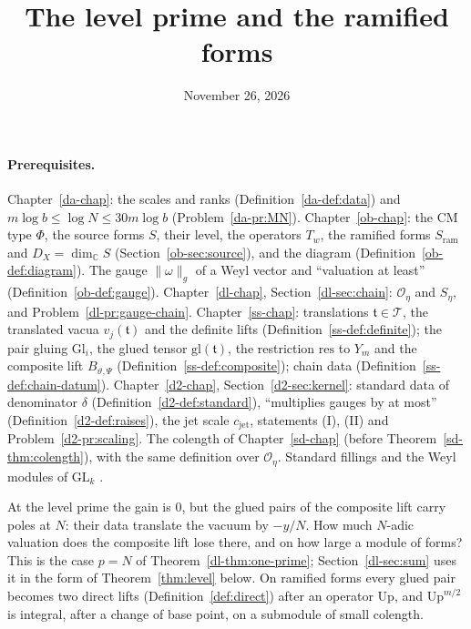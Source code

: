 \documentclass[reqno]{amsart}
\title{The level prime and the ramified forms}
\author{}
\date{November 26, 2026}
\newcounter{chap}
\theoremstyle{plain}
\theoremstyle{definition}
\theoremstyle{remark}
\newcommand{\C}{{\mathbb{C}}}
\newcommand{\Oc}{\mathcal O}
\newcommand{\ram}{\mathrm{ram}}
\newcommand{\Up}{\mathrm{Up}}
\newcommand{\cjet}{c_{\mathrm{jet}}}
\newcommand{\Tc}{\mathcal T}
\newcommand{\nb}[1]{\lVert #1 \rVert}
\begin{document}
\maketitle
{}\label{chap}

\paragraph{Prerequisites.}
Chapter~\ref{da-chap}: the scales and ranks (Definition~\ref{da-def:data}) and \(m\log b \le \log N \le 30m\log b\) (Problem~\ref{da-pr:MN}).  Chapter~\ref{ob-chap}: the CM type \(\Phi\), the source forms \(S\), their level, the operators \(T_w\), the ramified forms \(S_\ram\) and \(D_X = \dim_\C S\) (Section~\ref{ob-sec:source}), and the diagram (Definition~\ref{ob-def:diagram}).  The gauge \(\nb{\omega}_g\) of a Weyl vector and ``valuation at least'' (Definition~\ref{ob-def:gauge}).  Chapter~\ref{dl-chap}, Section~\ref{dl-sec:chain}: \(\Oc_\eta\) and \(S_\eta\), and Problem~\ref{dl-pr:gauge-chain}.  Chapter~\ref{ss-chap}: translations \(\mathfrak t \in \Tc\), the translated vacua \(v_j(\mathfrak t)\) and the definite lifts (Definition~\ref{ss-def:definite}); the pair gluing \(\mathrm{Gl}_i\), the glued tensor \(\mathrm{gl}(\mathfrak t)\), the restriction \(\mathrm{res}\) to \(Y_m\) and the composite lift \(B_{\vartheta,\Psi}\) (Definition~\ref{ss-def:composite}); chain data (Definition~\ref{ss-def:chain-datum}).  Chapter~\ref{d2-chap}, Section~\ref{d2-sec:kernel}: standard data of denominator \(\delta\) (Definition~\ref{d2-def:standard}), ``multiplies gauges by at most'' (Definition~\ref{d2-def:raises}), the jet scale \(\cjet\), statements (I), (II) and Problem~\ref{d2-pr:scaling}.  The colength of Chapter~\ref{sd-chap} (before Theorem~\ref{sd-thm:colength}), with the same definition over \(\Oc_\eta\).  Standard fillings and the Weyl modules of \(\mathrm{GL}_k\) \cite[\S8]{Fu}.

\medskip
At the level prime the gain is \(0\), but the glued pairs of the composite lift carry poles at \(N\): their data translate the vacuum by \(-y/N\).  How much \(N\)-adic valuation does the composite lift lose there, and on how large a module of forms?  This is the case \(p = N\) of Theorem~\ref{dl-thm:one-prime}; Section~\ref{dl-sec:sum} uses it in the form of Theorem~\ref{thm:level} below.  On ramified forms every glued pair becomes two direct lifts (Definition~\ref{def:direct}) after an operator \(\Up\), and \(\Up^{m/2}\) is integral, after a change of base point, on a submodule of small colength.
\end{document}
